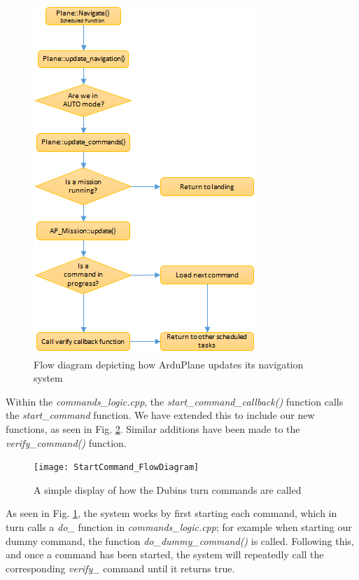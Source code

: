 \begin{figure}[htbp!] 
\centering    
\includegraphics[height=0.9\textheight]{Navigate_FlowDiagram}
\caption[ArduPlane's update navigation program flow]{Flow diagram depicting how ArduPlane updates its navigation system}
\label{fig:navigateFlow}
\end{figure}

Within the \textit{commands\_logic.cpp}, the \textit{start\_command\_callback()} function calls the \textit{start\_command} function. We have extended this to include our new functions, as seen in Fig. \ref{fig:startcommand}. Similar additions have been made to the \textit{verify\_command()} function. 

\begin{figure}[htbp!] 
\centering    
\texttt{[image: StartCommand\_FlowDiagram]}
\caption[Switch case to select the necessary command to execute]{A simple display of how the Dubins turn commands are called}
\label{fig:startcommand}
\end{figure}

As seen in Fig. \ref{fig:navigateFlow}, the system works by first starting each command, which in turn calls a \textit{do\_} function in \textit{commands\_logic.cpp}; for example when starting our dummy command, the function \textit{do\_dummy\_command()} is called. Following this, and once a command has been started, the system will repeatedly call the corresponding \textit{verify\_} command until it returns true. 

